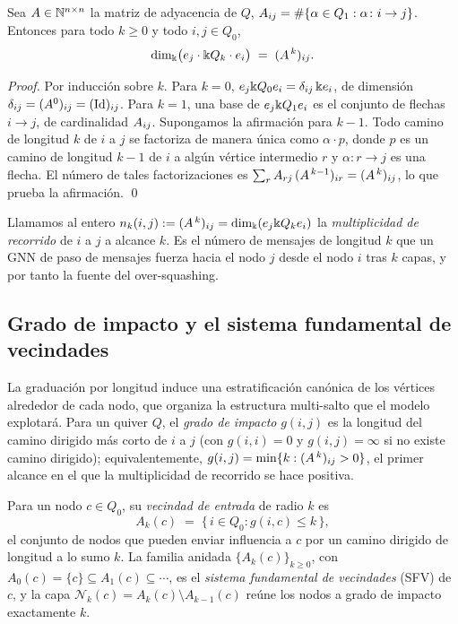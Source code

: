\begin{proposition}\label{prop:count}
Sea $A\in\mathbb{N}^{n\times n}$ la matriz de adyacencia de $Q$, $A_{ij}=\#\{\alpha
\in Q_1: \alpha\colon i\to j\}$. Entonces para todo $k\ge 0$ y todo $i,j\in Q_0$,
\[
  \dim_{\Bbbk}\bigl(e_j\cdot \Bbbk Q_k\cdot e_i\bigr)
  \;=\; (A^{\,k})_{ij}.
\]
\end{proposition}

\begin{proof}
Por inducción sobre $k$. Para $k=0$, $e_j\Bbbk Q_0 e_i=\delta_{ij}\,\Bbbk e_i$, de dimensión
$\delta_{ij}=(A^0)_{ij}=(\mathrm{Id})_{ij}$. Para $k=1$, una base de
$e_j\Bbbk Q_1 e_i$ es el conjunto de flechas $i\to j$, de cardinalidad $A_{ij}$.
Supongamos la afirmación para $k-1$. Todo camino de longitud $k$ de $i$ a $j$ se factoriza
de manera única como $\alpha\cdot p$, donde $p$ es un camino de longitud $k-1$ de $i$ a algún
vértice intermedio $r$ y $\alpha\colon r\to j$ es una flecha. El número de tales
factorizaciones es $\sum_{r}A_{rj}\,(A^{\,k-1})_{ir}=(A^{\,k})_{ij}$,
lo que prueba la afirmación. \qed
\end{proof}

Llamamos al entero $n_k(i,j):=(A^{\,k})_{ij}=\dim_\Bbbk(e_j\Bbbk Q_k e_i)$ la
\emph{multiplicidad de recorrido} de $i$ a $j$ a alcance $k$. Es el número
de mensajes de longitud $k$ que un GNN de paso de mensajes fuerza hacia el nodo $j$ desde
el nodo $i$ tras $k$ capas, y por tanto la fuente del over-squashing.

\subsection{Grado de impacto y el sistema fundamental de vecindades}
\label{sec:sfv}

La graduación por longitud induce una estratificación canónica de los vértices
alrededor de cada nodo, que organiza la estructura multi-salto que el modelo
explotará. Para un quiver $Q$, el \emph{grado de impacto} $g(i,j)$ es la longitud
del camino dirigido más corto de $i$ a $j$ (con $g(i,i)=0$ y $g(i,j)=\infty$ si no
existe camino dirigido); equivalentemente, $g(i,j)=\min\{k: (A^{\,k})_{ij}>0\}$,
el primer alcance en el que la multiplicidad de recorrido se hace positiva.

\begin{definition}\label{def:sfv}
Para un nodo $c\in Q_0$, su \emph{vecindad de entrada} de radio $k$ es
\[
  A_k(c) \;=\; \{\,i\in Q_0 : g(i,c)\le k\,\},
\]
el conjunto de nodos que pueden enviar influencia a $c$ por un camino dirigido de
longitud a lo sumo $k$. La familia anidada $\{A_k(c)\}_{k\ge 0}$, con
$A_0(c)=\{c\}\subseteq A_1(c)\subseteq\cdots$, es el \emph{sistema fundamental de
vecindades} (SFV) de $c$, y la capa $\mathcal{N}_k(c)=A_k(c)\setminus A_{k-1}(c)$
reúne los nodos a grado de impacto exactamente $k$.
\end{definition}

